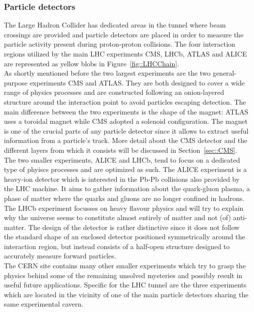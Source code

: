 \subsubsection{Particle detectors}
The Large Hadron Collider has dedicated areas in the tunnel where beam crossings are provided and particle detectors are placed in order to measure the particle activity present during proton-proton collisions. The four interaction regions utilized by the main LHC experiments CMS, LHCb, ATLAS and ALICE are represented as yellow blobs in Figure~\ref{fig::LHCChain}. 
\\
As shortly mentioned before the two largest experiments are the two general-purpose experiments CMS and ATLAS. They are both designed to cover a wide range of physics processes and are constructed following an onion-layered structure around the interaction point to avoid particles escaping detection. The main difference between the two experiments is the shape of the magnet: ATLAS uses a toroidal magnet while CMS adopted a solenoid configuration. The magnet is one of the crucial parts of any particle detector since it allows to extract useful information from a particle's track. More detail about the CMS detector and the different layers from which it consists will be discussed in Section~\ref{sec::CMS}.
\\
The two smaller experiments, ALICE and LHCb, tend to focus on a dedicated type of phyiscs processes and are optimized as such. The ALICE experiment is a heavy-ion detector which is interested in the Pb-Pb collisions also provided by the LHC machine. It aims to gather information about the quark-gluon plasma, a phase of matter where the quarks and gluons are no longer confined in hadrons. The LHCb experiment focusses on heavy flavour physics and will try to explain why the universe seems to constitute almost entirely of matter and not (of) anti-matter. The design of the detector is rather distinctive since it does not follow the standard shape of an enclosed detector positioned symmetrically around the interaction region, but instead consists of a half-open structure designed to accurately measure forward particles.
\\
The CERN site contains many other smaller experiments which try to grasp the physics behind some of the remaining unsolved mysteries and possibly result in useful future applications. 
Specific for the LHC tunnel are the three experiments which are located in the vicinity of one of the main particle detectors sharing the same experimental cavern.
